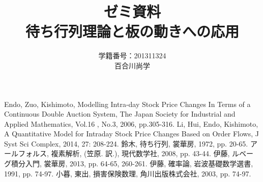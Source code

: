 \documentclass[a4j,papersize,disablejfam,slide,14pt]{jsarticle}
\begin{document}
\title{\Huge ゼミ資料\\待ち行列理論と板の動きへの応用}
\author{\Large 学籍番号：201311324\\百合川尚学}
\maketitle

\tableofcontents

\begin{thebibliography}{9}
         {\rm Endo, Zuo, Kishimoto, 
        Modelling Intra-day Stock Price Changes In Terms of
        a Continuous Double Auction System, 
        The Japan Society for Industrial and Applied Mathematics, 
        Vol.16 , No.3, 2006, pp.305-316.}
         {\rm Li, Hui, Endo, Kishimoto, A Quantitative Model for Intraday Stock Price
         Changes Based on Order Flows, 
         J Syst Sci Complex, 2014, 27: 208-224.}
         {\rm 鈴木, 待ち行列, 裳華房, 1972, pp. 20-65.}
         {\rm アールフォルス, 複素解析, (笠原. 訳.), 現代数学社, 2008, pp. 43-44.}
         {\rm 伊藤, ルベーグ積分入門, 裳華房, 2013, pp. 64-65, 260-261.}
         {\rm 伊藤, 確率論, 岩波基礎数学選書, 1991, pp. 74-97.}
         {\rm 小暮, 東出, 損害保険数理, 角川出版株式会社, 2003, pp. 74-97.}
\end{thebibliography}
\end{document}
